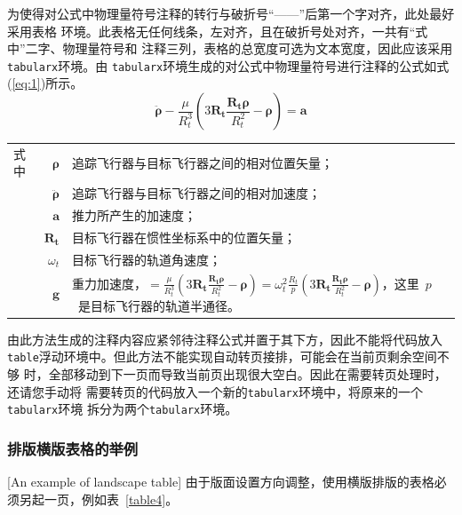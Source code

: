 为使得对公式中物理量符号注释的转行与破折号“——”后第一个字对齐，此处最好采用表格
环境。此表格无任何线条，左对齐，且在破折号处对齐，一共有“式中”二字、物理量符号和
注释三列，表格的总宽度可选为文本宽度，因此应该采用\verb|tabularx|环境。由
\verb|tabularx|环境生成的对公式中物理量符号进行注释的公式如式(\ref{eq:1})所示。
\begin{equation}\label{eq:1}
  \ddot{\boldsymbol{\rho}}-\frac{\mu}{R_{t}^{3}}\left(3\mathbf{R_{t}}\frac{\mathbf{R_{t}\rho}}{R_{t}^{2}}-\boldsymbol{\rho}\right)=\mathbf{a}
\end{equation}
\begin{tabularx}{\textwidth}{@{}l@{\quad}r@{——}X@{}}
  式中 & $\boldsymbol{\rho}$        & 追踪飞行器与目标飞行器之间的相对位置矢量； \\
       & $\boldsymbol{\ddot{\rho}}$ & 追踪飞行器与目标飞行器之间的相对加速度；   \\
       & $\mathbf{a}$               & 推力所产生的加速度；                       \\
       & $\mathbf{R_t}$             & 目标飞行器在惯性坐标系中的位置矢量；       \\
       & $\omega_{t}$               & 目标飞行器的轨道角速度；                   \\
       & $\mathbf{g}$               & 重力加速度，$=\frac{\mu}{R_{t}^{3}}\left(
    3\mathbf{R_{t}}\frac{\mathbf{R_{t}\rho}}{R_{t}^{2}}-\boldsymbol{\rho}\right)=\omega_{t}^{2}\frac{R_{t}}{p}\left(
    3\mathbf{R_{t}}\frac{\mathbf{R_{t}\rho}}{R_{t}^{2}}-\boldsymbol{\rho}\right)$，这里~$p$~是目标飞行器的轨道半通径。
\end{tabularx}\vspace{3.15bp}
由此方法生成的注释内容应紧邻待注释公式并置于其下方，因此不能将代码放入
\verb|table|浮动环境中。但此方法不能实现自动转页接排，可能会在当前页剩余空间不够
时，全部移动到下一页而导致当前页出现很大空白。因此在需要转页处理时，还请您手动将
需要转页的代码放入一个新的\verb|tabularx|环境中，将原来的一个\verb|tabularx|环境
拆分为两个\verb|tabularx|环境。

\subsubsection{排版横版表格的举例}[An example of landscape table]
由于版面设置方向调整，使用横版排版的表格必须另起一页，例如表~\ref{table4}。

